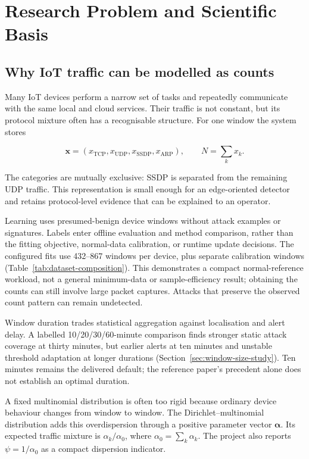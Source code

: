\section{Research Problem and Scientific Basis}

\subsection{Why IoT traffic can be modelled as counts}

Many IoT devices perform a narrow set of tasks and repeatedly communicate with
the same local and cloud services. Their traffic is not constant, but its protocol
mixture often has a recognisable structure. For one window the system stores

\[
\mathbf{x}=(x_{\mathrm{TCP}},x_{\mathrm{UDP}},x_{\mathrm{SSDP}},x_{\mathrm{ARP}}),
\qquad N=\sum_k x_k.
\]

The categories are mutually exclusive: SSDP is separated from the remaining UDP
traffic. This representation is small enough for an edge-oriented detector and
retains protocol-level evidence that can be explained to an operator.

Learning uses presumed-benign device windows without attack examples or
signatures. Labels enter offline evaluation and method comparison, rather than
the fitting objective, normal-data calibration, or runtime update decisions.
The configured fits use 432--867 windows per device, plus separate calibration
windows (Table~\ref{tab:dataset-composition}). This demonstrates a compact
normal-reference workload, not a general minimum-data or sample-efficiency
result; obtaining the counts can still involve large packet captures.
Attacks that preserve the observed count pattern can remain undetected.

Window duration trades statistical aggregation against localisation and alert
delay. A labelled 10/20/30/60-minute comparison finds stronger static attack
coverage at thirty minutes, but earlier alerts at ten minutes and unstable
threshold adaptation at longer durations (Section~\ref{sec:window-size-study}).
Ten minutes remains the delivered default; the reference paper's precedent
alone does not establish an optimal duration.

A fixed multinomial distribution is often too rigid because ordinary device
behaviour changes from window to window. The Dirichlet--multinomial distribution
adds this overdispersion through a positive parameter vector
$\boldsymbol{\alpha}$. Its expected traffic mixture is
$\alpha_k/\alpha_0$, where $\alpha_0=\sum_k\alpha_k$. The project also reports
$\psi=1/\alpha_0$ as a compact dispersion indicator.

